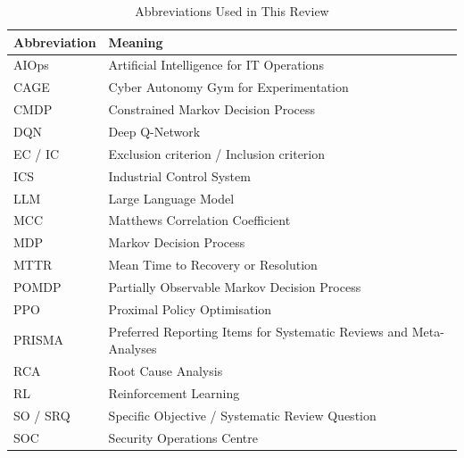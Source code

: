 \begin{table}[!t]
\centering
\caption{Abbreviations Used in This Review}
\label{tab:abbrev}
\footnotesize
\begin{tabularx}{\columnwidth}{@{}lL@{}}
\toprule
Abbreviation & Meaning \\
\midrule
AIOps & Artificial Intelligence for IT Operations \\
CAGE & Cyber Autonomy Gym for Experimentation \\
CMDP & Constrained Markov Decision Process \\
DQN & Deep Q-Network \\
EC / IC & Exclusion criterion / Inclusion criterion \\
ICS & Industrial Control System \\
LLM & Large Language Model \\
MCC & Matthews Correlation Coefficient \\
MDP & Markov Decision Process \\
MTTR & Mean Time to Recovery or Resolution \\
POMDP & Partially Observable Markov Decision Process \\
PPO & Proximal Policy Optimisation \\
PRISMA & Preferred Reporting Items for Systematic Reviews and Meta-Analyses \\
RCA & Root Cause Analysis \\
RL & Reinforcement Learning \\
SO / SRQ & Specific Objective / Systematic Review Question \\
SOC & Security Operations Centre \\
\bottomrule
\end{tabularx}
\end{table}
